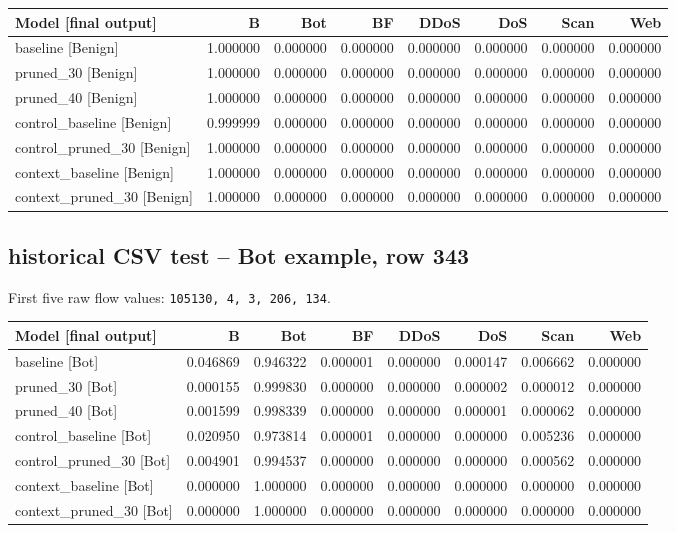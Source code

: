 \documentclass[11pt,a4paper,oneside]{report}
\newcommand{\code}[1]{\nolinkurl{#1}}
\begin{document}
{\small
\begin{longtable}{@{}p{}rrrrrrr@{}}
\toprule
Model [final output] & B & Bot & BF & DDoS & DoS & Scan & Web\\\midrule\endhead
baseline [Benign] & 1.000000 & 0.000000 & 0.000000 & 0.000000 & 0.000000 & 0.000000 & 0.000000\\
pruned\_30 [Benign] & 1.000000 & 0.000000 & 0.000000 & 0.000000 & 0.000000 & 0.000000 & 0.000000\\
pruned\_40 [Benign] & 1.000000 & 0.000000 & 0.000000 & 0.000000 & 0.000000 & 0.000000 & 0.000000\\
control\_baseline [Benign] & 0.999999 & 0.000000 & 0.000000 & 0.000000 & 0.000000 & 0.000000 & 0.000000\\
control\_pruned\_30 [Benign] & 1.000000 & 0.000000 & 0.000000 & 0.000000 & 0.000000 & 0.000000 & 0.000000\\
context\_baseline [Benign] & 1.000000 & 0.000000 & 0.000000 & 0.000000 & 0.000000 & 0.000000 & 0.000000\\
context\_pruned\_30 [Benign] & 1.000000 & 0.000000 & 0.000000 & 0.000000 & 0.000000 & 0.000000 & 0.000000\\
\bottomrule\end{longtable}
}

\subsection{historical CSV test -- Bot example, row 343}
First five raw flow values: \code{105130, 4, 3, 206, 134}.

{\small
\begin{longtable}{@{}p{}rrrrrrr@{}}
\toprule
Model [final output] & B & Bot & BF & DDoS & DoS & Scan & Web\\\midrule\endhead
baseline [Bot] & 0.046869 & 0.946322 & 0.000001 & 0.000000 & 0.000147 & 0.006662 & 0.000000\\
pruned\_30 [Bot] & 0.000155 & 0.999830 & 0.000000 & 0.000000 & 0.000002 & 0.000012 & 0.000000\\
pruned\_40 [Bot] & 0.001599 & 0.998339 & 0.000000 & 0.000000 & 0.000001 & 0.000062 & 0.000000\\
control\_baseline [Bot] & 0.020950 & 0.973814 & 0.000001 & 0.000000 & 0.000000 & 0.005236 & 0.000000\\
control\_pruned\_30 [Bot] & 0.004901 & 0.994537 & 0.000000 & 0.000000 & 0.000000 & 0.000562 & 0.000000\\
context\_baseline [Bot] & 0.000000 & 1.000000 & 0.000000 & 0.000000 & 0.000000 & 0.000000 & 0.000000\\
context\_pruned\_30 [Bot] & 0.000000 & 1.000000 & 0.000000 & 0.000000 & 0.000000 & 0.000000 & 0.000000\\
\bottomrule\end{longtable}
}
\end{document}
